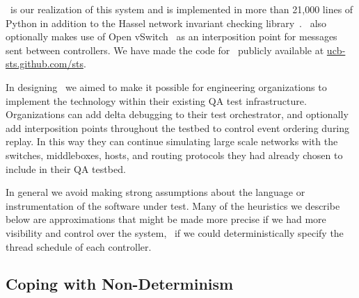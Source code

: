 
\projectname~is our realization of this system and is implemented in more than 21,000 lines of Python in
addition to the Hassel network invariant checking library~\cite{hsa}.
\projectname~also optionally makes use of Open vSwitch~\cite{pfaff2009extending} as an interposition point for
messages sent between controllers. We have
made the code for \projectname~publicly available at \href{http://ucb-sts.github.com/sts}{ucb-sts.github.com/sts}.

 In designing \projectname~we aimed to make
it possible for engineering organizations to
implement the technology within their existing QA test infrastructure.
Organizations can add delta debugging to their test
orchestrator, and optionally add interposition points throughout the
testbed to control event ordering during replay.
In this way they can continue simulating large scale networks with
the switches, middleboxes, hosts, and routing protocols they had already
chosen to include in their QA testbed.

In general we avoid making strong assumptions about the language or instrumentation of the
software under test. Many of the heuristics we describe below are
approximations that might be made more precise if we had more visibility and
control over the system, \eg~if we could deterministically specify the thread schedule of each
controller.


\subsection{Coping with Non-Determinism}
\label{subsec:coping}

